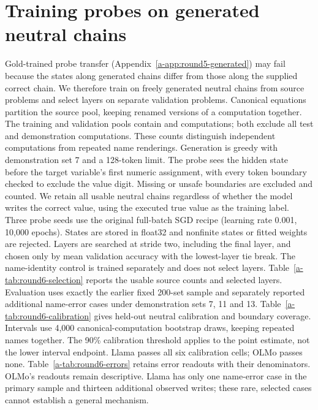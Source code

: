 \section{Training probes on generated neutral chains}
\label{a-app:round6-generated}
Gold-trained probe transfer (Appendix~\ref{a-app:round5-generated}) may fail because the states along generated chains differ from those along the supplied correct chain. We therefore train on freely generated neutral chains from  source problems and select layers on  separate validation problems. Canonical equations partition the source pool, keeping renamed versions of a computation together. The training and validation pools contain  and  computations; both exclude all test and demonstration computations. These counts distinguish independent computations from repeated name renderings.
Generation is greedy with demonstration set 7 and a 128-token limit. The probe sees the hidden state before the target variable's first numeric assignment, with every token boundary checked to exclude the value digit. Missing or unsafe boundaries are excluded and counted. We retain all usable neutral chains regardless of whether the model writes the correct value, using the executed true value as the training label. Three probe seeds use the original full-batch SGD recipe (learning rate 0.001, 10,000 epochs). States are stored in float32 and nonfinite states or fitted weights are rejected. Layers are searched at stride two, including the final layer, and chosen only by mean validation accuracy with the lowest-layer tie break. The name-identity control is trained separately and does not select layers.
Table~\ref{a-tab:round6-selection} reports the usable source counts and selected layers. Evaluation uses exactly the earlier fixed 200-set sample and separately reported additional name-error cases under demonstration sets 7, 11 and 13. Table~\ref{a-tab:round6-calibration} gives held-out neutral calibration and boundary coverage. Intervals use 4,000 canonical-computation bootstrap draws, keeping repeated names together. The 90\% calibration threshold applies to the point estimate, not the lower interval endpoint.
Llama passes all six calibration cells; OLMo passes none. Table~\ref{a-tab:round6-errors} retains error readouts with their denominators. OLMo's readouts remain descriptive. Llama has only one name-error case in the primary sample and thirteen additional observed writes; these rare, selected cases cannot establish a general mechanism.
